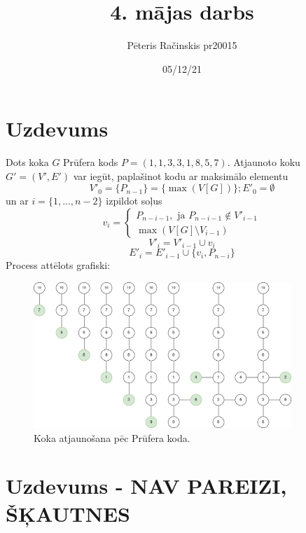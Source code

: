 \documentclass[12pt, a4paper]{article}
\author{Pēteris Račinskis pr20015}
\date{05/12/21}
\begin{document}
\title{4. mājas darbs}

\maketitle

\section{Uzdevums}

Dots koka $G$ Prūfera kods $P=(1,1,3,3,1,8,5,7)$. Atjaunoto koku $G' = (V',E')$ var iegūt, paplašinot kodu ar maksimālo elementu
\begin{equation}
    V'_0 = \lbrace P_{n-1} \rbrace = \lbrace \max(V[G]) \rbrace; E'_0=\emptyset
\end{equation}
un ar $i=\lbrace 1, ..., n-2 \rbrace$ izpildot soļus
\begin{equation}
    v_i = 
\begin{cases}
    P_{n-i-1}, \text{ ja } P_{n-i-1} \notin V'_{i-1} \\
    \max(V[G] \setminus V_{i-1})
\end{cases}
\end{equation}
\begin{equation}
    V'_i = V'_{i-1} \cup v_i
\end{equation}
\begin{equation}
    E'_i = E'_{i-1} \cup \lbrace v_i, P_{n-i} \rbrace
\end{equation}
Process attēlots grafiski:

\begin{figure}[h!]
    \centering
    \includegraphics[height=5.5cm,page=1]{pruefer.png}
    \caption{Koka atjaunošana pēc Prūfera koda.}
\end{figure}

\newpage
\section{Uzdevums - NAV PAREIZI, ŠĶAUTNES}
\end{document}
